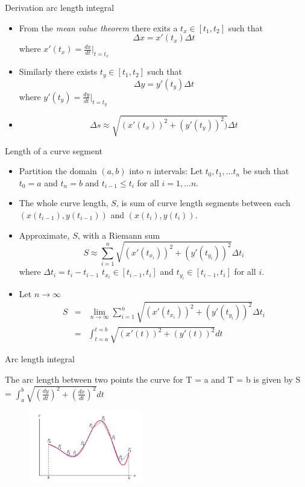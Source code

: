\documentclass{beamer}
\begin{document}
\begin{frame}{Derivation arc length integral}	
	\begin{itemize}
		\item From the \emph{mean value theorem} there exits a $t_x \in [t_1, t_2]$ such that	
		\[
			\Delta x = x'(t_x) \Delta t
		\]
		where $x'(t_x) = \frac{dx}{dt}\big|_{t=t_x}$
		\item Similarly there exists $t_y \in [t_1, t_2]$ such that 
		\[
			\Delta y = y'(t_y) \Delta t
		\]
		where $y'(t_y) = \frac{dy}{dt}\big|_{t=t_y}$ 
		\item 
		\[
			\Delta s \approx \sqrt{\left(x'(t_x)\right)^2 + \left(y'(t_y)\right)^2)} \Delta t
		\]
	\end{itemize}
\end{frame}

\begin{frame}{Length of a curve segment}
	
	\begin{itemize}
		\item Partition the domain $(a,b)$ into $n$ intervals: Let $t_0, t_1, \dots t_n$ be such that $t_0=a$ and $t_n=b$ and $t_{i-1} \le t_{i}$ for all $i=1, \dots n$. 
		\item The whole curve length, $S$, is sum of curve length segments between each $(x(t_{i-1}), y(t_{i-1}))$ and $(x(t_i), y(t_i))$.  
		\item Approximate, $S$, with a Riemann sum 
		\[
			S \approx \sum\limits^{n}_{i=1} \sqrt{\left(x'(t_{x_i})\right)^2 + \left(y'(t_{y_i})\right)^2} \Delta t_i 
		\] 
		where $\Delta t_i = t_i-t_{i-1}$
		$t_{x_i} \in [t_{i-1}, t_{i}]$ and $t_{y_i} \in [t_{i-1}, t_{i}]$ for all $i$.
		\item Let $n \to \infty$ 
		\begin{eqnarray*}
			S &=& \lim_{n \to \infty} \sum\limits^{n}_{i=1} \sqrt{\left(x'(t_{x_i})\right)^2 + \left(y'(t_{y_i})\right)^2} \Delta t_i \\
			& = & \int_{t=a}^{t=b} \sqrt{(x'(t))^2 + (y'(t))^2 } dt
		\end{eqnarray*}
	\end{itemize}
\end{frame}

\begin{frame}{Arc length integral}
	\begin{theorem}
		The arc length between two points the curve for T = a and T = b is given by
		S = $\int_{a}^{b} \sqrt{\left( \frac{dy}{dt} \right)^2 + \left( \frac{dx}{dt} \right)^2}dt$
	\end{theorem}
	\begin{figure}
		\centering
		\includegraphics[width=50mm, scale=0.4]{Arc length Integral.png}
	\end{figure}
\end{frame}
\end{document}
